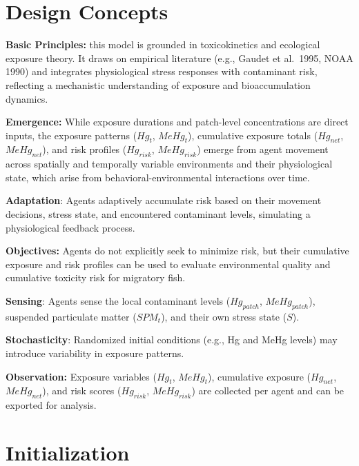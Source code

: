 \documentclass[
]{book}
\begin{document}
\section{Design Concepts}\label{design-concepts-1}

\textbf{Basic Principles:} this model is grounded in toxicokinetics and ecological exposure theory. It draws on empirical literature (e.g., Gaudet et al.~1995, NOAA 1990) and integrates physiological stress responses with contaminant risk, reflecting a mechanistic understanding of exposure and bioaccumulation dynamics.

\textbf{Emergence:} While exposure durations and patch-level concentrations are direct inputs, the exposure patterns (\(Hg_{t}\), \(MeHg_{t}\)), cumulative exposure totals (\(Hg_{net}\), \(MeHg_{net}\)), and risk profiles (\(Hg_{risk}\), \(MeHg_{risk}\)) emerge from agent movement across spatially and temporally variable environments and their physiological state, which arise from behavioral-environmental interactions over time.

\textbf{Adaptation}: Agents adaptively accumulate risk based on their movement decisions, stress state, and encountered contaminant levels, simulating a physiological feedback process.

\textbf{Objectives:} Agents do not explicitly seek to minimize risk, but their cumulative exposure and risk profiles can be used to evaluate environmental quality and cumulative toxicity risk for migratory fish.

\textbf{Sensing}: Agents sense the local contaminant levels (\(Hg_{patch}\), \(MeHg_{patch}\)), suspended particulate matter (\(SPM_{t}\)), and their own stress state (\(S\)).

\textbf{Stochasticity}: Randomized initial conditions (e.g., Hg and MeHg levels) may introduce variability in exposure patterns.

\textbf{Observation:} Exposure variables (\(Hg_t\), \(MeHg_{t}\)), cumulative exposure (\(Hg_{net}\), \(MeHg_{net}\)), and risk scores (\(Hg_{risk}\), \(MeHg_{risk}\)) are collected per agent and can be exported for analysis.

\section{Initialization}\label{initialization-1}
\end{document}
